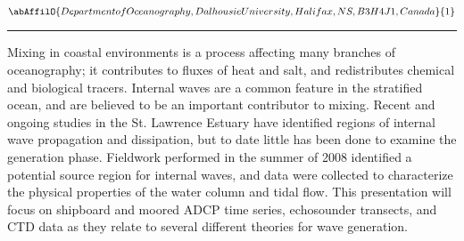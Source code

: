 \begin{minipage}{\linewidth}\begin{center}\begin{minipage}{\linewidth}
   \vspace{2 mm} \begin{center}
    \vspace{2 mm}\begin{center}
  
  $\abAffilO{Department of Oceanography, Dalhousie University, Halifax, NS, B3H 4J1, Canada}{1}$

  \end{center}
  \vspace{2 mm}
  \end{center}\end{minipage}\end{center}
  \begin{center}\rule{0.70\linewidth}{0.5 pt}\end{center}
  \begin{minipage}{\linewidth}
\noindent Mixing in coastal environments is a process affecting many branches of oceanography; it contributes to fluxes of heat and salt, and redistributes chemical and biological tracers. Internal waves are a common feature in the stratified ocean, and are believed to be an important contributor to mixing. Recent and ongoing studies in the St. Lawrence Estuary have identified regions of internal wave propagation and dissipation, but to date little has been done to examine the generation phase. Fieldwork performed in the summer of 2008 identified a potential source region for internal waves, and data were collected to characterize the physical properties of the water column and tidal flow. This presentation will focus on shipboard and moored ADCP time series, echosounder transects, and CTD data as they relate to several different theories for wave generation.
\end{minipage}\end{minipage}

